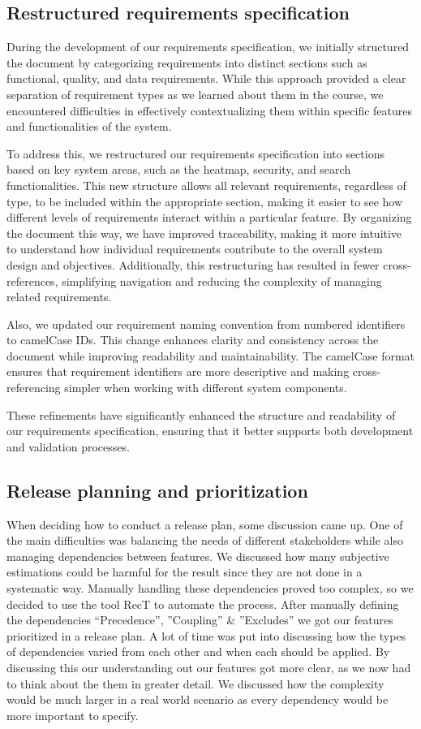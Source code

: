 \subsection{Restructured requirements specification}
During the development of our requirements specification, we initially structured the document by categorizing requirements into distinct sections such as functional, quality, and data requirements. While this approach provided a clear separation of requirement types as we learned about them in the course, we encountered difficulties in effectively contextualizing them within specific features and functionalities of the system.

To address this, we restructured our requirements specification into sections based on key system areas, such as the heatmap, security, and search functionalities. This new structure allows all relevant requirements, regardless of type, to be included within the appropriate section, making it easier to see how different levels of requirements interact within a particular feature. By organizing the document this way, we have improved traceability, making it more intuitive to understand how individual requirements contribute to the overall system design and objectives. Additionally, this restructuring has resulted in fewer cross-references, simplifying navigation and reducing the complexity of managing related requirements.

Also, we updated our requirement naming convention from numbered identifiers to camelCase IDs. This change enhances clarity and consistency across the document while improving readability and maintainability. The camelCase format ensures that requirement identifiers are more descriptive and making cross-referencing simpler when working with different system components.

These refinements have significantly enhanced the structure and readability of our requirements specification, ensuring that it better supports both development and validation processes.

\subsection{Release planning and prioritization}
When deciding how to conduct a release plan, some discussion came up. One of the main difficulties was balancing the needs of different stakeholders while also managing dependencies between features. We discussed how many subjective estimations could be harmful for the result since they are not done in a systematic way. Manually handling these dependencies proved too complex, so we decided to use the tool RecT to automate the process. After manually defining the dependencies “Precedence”, ”Coupling” & ”Excludes” we got our features prioritized in a release plan. A lot of time was put into discussing how the types of dependencies varied from each other and when each should be applied. By discussing this our understanding out our features got more clear, as we now had to think about the them in greater detail. We discussed how the complexity would be much larger in a real world scenario as every dependency would be more important to specify. 

